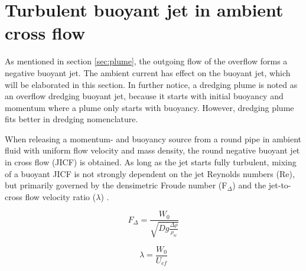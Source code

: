 \label{sec:froudenr}


\section{Turbulent buoyant jet in ambient cross flow}
As mentioned in section \ref{sec:plume}, the outgoing flow of the overflow forms a negative buoyant jet. The ambient current has effect on the buoyant jet, which will be elaborated in this section. In further notice, a dredging plume is noted as an overflow dredging buoyant jet, because it starts with initial buoyancy and momentum where a plume only starts with buoyancy. However, dredging plume fits better in dredging nomenclature.  \newline

\noindent When releasing a momentum- and buoyancy source from a round pipe in ambient fluid with uniform flow velocity and mass density, the round negative buoyant jet in cross flow (JICF) is obtained. As long as the jet starts fully turbulent, mixing of a buoyant JICF is not strongly dependent on the jet Reynolds numbers (Re), but primarily governed by the densimetric Froude number (F$_{\Delta}$) and the jet-to-cross flow velocity ratio ($\lambda$) \citep{Jirka}.

\begin{equation}
\label{eq:Froude}
    F_{\Delta} = \frac{W_0}{\sqrt{D g  \frac{\Delta \rho}{\rho_w}}}
\end{equation}

\begin{equation}
\label{eq:velocity_ratio}
 \lambda = \frac{W_0}{U_{cf}}
\end{equation}
\newline


